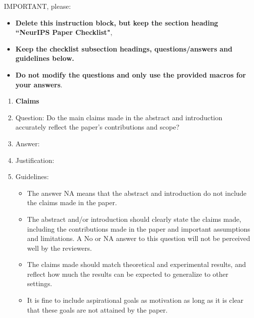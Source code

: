 \documentclass{article}
\begin{document}
IMPORTANT, please:
\begin{itemize}
    \item {\bf Delete this instruction block, but keep the section heading ``NeurIPS Paper Checklist"},
    \item  {\bf Keep the checklist subsection headings, questions/answers and guidelines below.}
    \item {\bf Do not modify the questions and only use the provided macros for your answers}.
\end{itemize} 
 



\begin{enumerate}

\item {\bf Claims}
    \item[] Question: Do the main claims made in the abstract and introduction accurately reflect the paper's contributions and scope?
    \item[] Answer: \answerTODO{} %
    \item[] Justification: \justificationTODO{}
    \item[] Guidelines:
    \begin{itemize}
        \item The answer NA means that the abstract and introduction do not include the claims made in the paper.
        \item The abstract and/or introduction should clearly state the claims made, including the contributions made in the paper and important assumptions and limitations. A No or NA answer to this question will not be perceived well by the reviewers. 
        \item The claims made should match theoretical and experimental results, and reflect how much the results can be expected to generalize to other settings. 
        \item It is fine to include aspirational goals as motivation as long as it is clear that these goals are not attained by the paper. 
    \end{itemize}


\end{enumerate}
\end{document}
